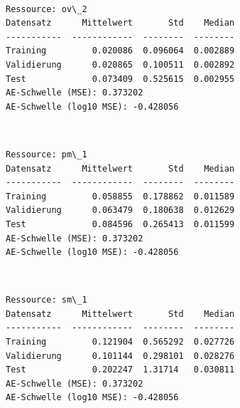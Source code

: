 \documentclass[11pt]{article}
\begin{document}
    \begin{center}
    \end{center}
    { \hspace*{\fill} \\}
    
    \begin{Verbatim}[commandchars=\\\{\}]
Ressource: ov\_2
Datensatz      Mittelwert       Std    Median
-----------  ------------  --------  --------
Training         0.020086  0.096064  0.002889
Validierung      0.020865  0.100511  0.002892
Test             0.073409  0.525615  0.002955
AE-Schwelle (MSE): 0.373202
AE-Schwelle (log10 MSE): -0.428056

    \end{Verbatim}

    \begin{center}
    \end{center}
    { \hspace*{\fill} \\}
    
    \begin{Verbatim}[commandchars=\\\{\}]
Ressource: pm\_1
Datensatz      Mittelwert       Std    Median
-----------  ------------  --------  --------
Training         0.058855  0.178862  0.011589
Validierung      0.063479  0.180638  0.012629
Test             0.084596  0.265413  0.011599
AE-Schwelle (MSE): 0.373202
AE-Schwelle (log10 MSE): -0.428056

    \end{Verbatim}

    \begin{center}
    \end{center}
    { \hspace*{\fill} \\}
    
    \begin{Verbatim}[commandchars=\\\{\}]
Ressource: sm\_1
Datensatz      Mittelwert       Std    Median
-----------  ------------  --------  --------
Training         0.121904  0.565292  0.027726
Validierung      0.101144  0.298101  0.028276
Test             0.202247  1.31714   0.030811
AE-Schwelle (MSE): 0.373202
AE-Schwelle (log10 MSE): -0.428056

    \end{Verbatim}
\end{document}
